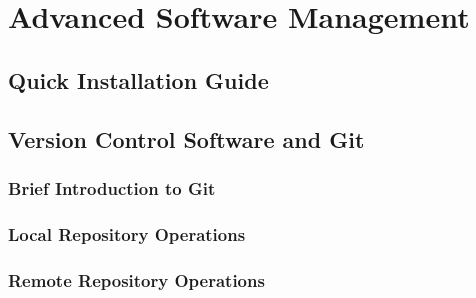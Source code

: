 \chapter{Advanced Software Management}


\section{Quick Installation Guide}


\section{Version Control Software and Git}

\subsection{Brief Introduction to Git}

\subsection{Local Repository Operations}

\subsection{Remote Repository Operations}


















